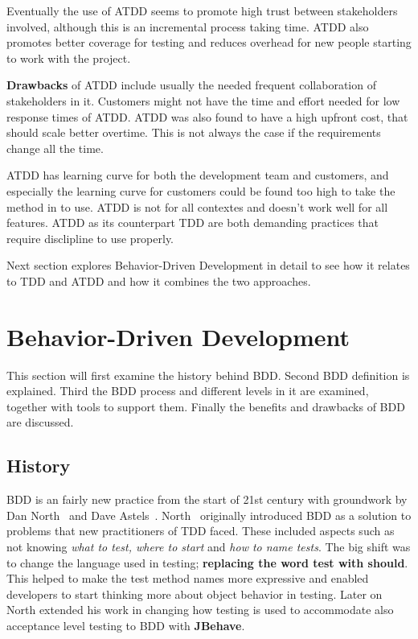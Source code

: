     Eventually the use of ATDD seems to promote high trust between stakeholders involved, although
    this is an incremental process taking time. ATDD also promotes better coverage for testing
    and reduces overhead for new people starting to work with the project. ~\cite{haugset2012automated}

    \textbf{Drawbacks} of ATDD include usually the needed frequent collaboration of stakeholders in it. Customers
    might not have the time and effort needed for low response times of ATDD. ATDD was also found to have a high
    upfront cost, that should scale better overtime. This is not always the case if the requirements change all the time. ~\cite{haugset2012automated}

    ATDD has learning curve for both the development team and customers, and especially the learning curve for customers
    could be found too high to take the method in to use. ATDD is not for all contextes and doesn't work well for all features.
    ATDD as its counterpart TDD are both demanding practices that require
    disclipline to use properly.~\cite{haugset2012automated}

    Next section explores Behavior-Driven Development
    in detail to see how it relates to TDD and ATDD and how it combines the two approaches.
\clearpage
\section{Behavior-Driven Development} %
    This section will first examine the history behind BDD. Second BDD definition is explained.
    Third the BDD process and different levels in it are examined, together with tools to support them. Finally
    the benefits and drawbacks of BDD are discussed.

    \subsection{History}
    BDD is an fairly new practice from the start of 21st century with groundwork by Dan North~\cite{bdd2006north} and Dave Astels~\cite{astels2006new}.
    North~\cite{bdd2006north} originally introduced BDD as a solution to problems that new practitioners of TDD faced.
    These included aspects such as not knowing \textit{what to test, where to start} and \textit{how to name tests}. The
    big shift was to change the language used in testing; \textbf{replacing the word test with should}. This helped to make
    the test method names more expressive and enabled developers to start thinking more about object behavior in testing.
    Later on North extended his work in changing how testing is used to accommodate also acceptance level testing to BDD with \textbf{JBehave}.


